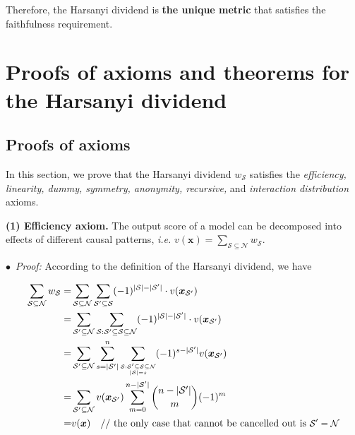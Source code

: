 Therefore, the Harsanyi dividend is \textbf{the unique metric} that satisfies the faithfulness requirement.

\section{Proofs of axioms and theorems for the Harsanyi dividend}
\label{sec:app-proof-harsanyi-property}

\subsection{Proofs of axioms}
\label{sec:app-interaction-axioms}

In this section, we prove that the Harsanyi dividend {\small$w_{\mathcal{S}}$} satisfies the \emph{efficiency, linearity, dummy, symmetry, anonymity, recursive,} and \emph{interaction distribution} axioms.

\textbf{(1) Efficiency axiom.} The output score of a model can be decomposed into effects of different causal patterns, \emph{i.e.} {\small $v(\boldsymbol{x})=\sum_{\mathcal{S}\subseteq\mathcal{N}}w_{\mathcal{S}}$}.

$\bullet$~\textit{Proof:} According to the definition of the Harsanyi dividend, we have

\begin{small}
\begin{align*}
\sum_{\mathcal{S}\subseteq \mathcal{N}} w_{\mathcal{S}} 
=& \sum_{\mathcal{S}\subseteq \mathcal{N}} \sum_{\mathcal{S}'\subseteq \mathcal{S}} (-1)^{|\mathcal{S}|-|\mathcal{S}'|}\cdot v(\boldsymbol{x}_{\mathcal{S}'})\\
=& \sum_{\mathcal{S}'\subseteq \mathcal{N}} \sum_{\scriptsize\mathcal{S}:\mathcal{S}'\subseteq\mathcal{S}\subseteq\mathcal{N}} (-1)^{|\mathcal{S}|-|\mathcal{S}'|}\cdot v(\boldsymbol{x}_{\mathcal{S}'})\\
=& \sum_{\mathcal{S}'\subseteq \mathcal{N}} \sum_{s=|\mathcal{S}'|}^{n} \sum_{\scriptsize\substack{\mathcal{S}:\mathcal{S}'\subseteq\mathcal{S}\subseteq\mathcal{N}\\
|\mathcal{S}|=s}} (-1)^{s-|\mathcal{S}'|}v(\boldsymbol{x}_{\mathcal{S}'})\\
=& \sum_{\mathcal{S}'\subseteq \mathcal{N}}v(\boldsymbol{x}_{\mathcal{S}'}) \sum_{m=0}^{n-|\mathcal{S}'|} \binom{n-|\mathcal{S}'|}{m} (-1)^{m}\\
=& v(\boldsymbol{x}) \quad\text{// the only case that cannot be cancelled out is {\small$\mathcal{S}'=\mathcal{N}$}}
\end{align*}
\end{small}



